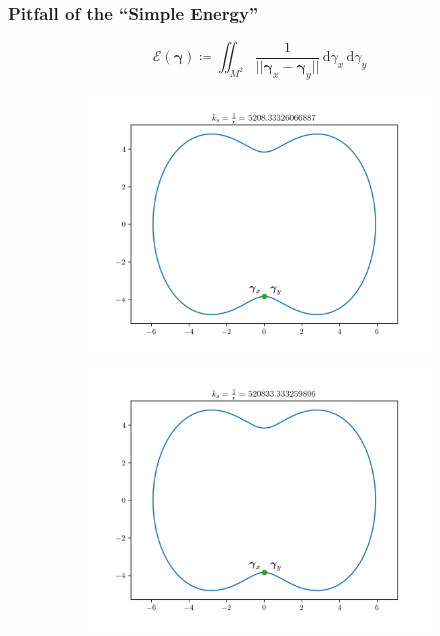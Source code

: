 \documentclass{beamer}
\theoremstyle{remark}
\newcommand{\gammabf}{\boldsymbol{\gamma}}
\newcommand{\intd}{\, \text{d}}
\newcommand{\norm}[1]{\lvert \lvert #1 \rvert \rvert}
\begin{document}
\begin{frame}
    \frametitle{Pitfall of the ``Simple Energy''}
        \begin{equation*}
            \mathcal{E} \left( \gammabf \right) \coloneqq \iint_{M^2} \frac{1}{\norm{\gammabf_x - \gammabf_y}} \intd \gamma_x \intd \gamma_y
        \end{equation*}
        \begin{figure}[h]
            \centering
            \begin{subfigure}[b]{0.45\textwidth}
                \centering
                \includegraphics[width=\textwidth]{simple-2}
            \end{subfigure}
            \begin{subfigure}[b]{0.45\textwidth}
                \centering
                \includegraphics[width=\textwidth]{simple-3}
            \end{subfigure}
        \end{figure}
\end{frame}
\end{document}

